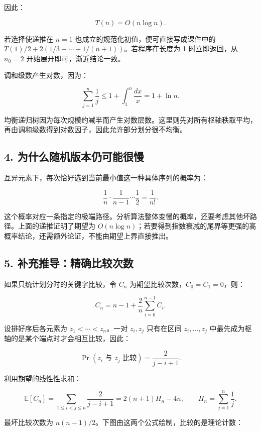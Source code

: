\documentclass[
  UTF8,fontset=none,zihao=5]{ctexart}
\let\OldSubsection\subsection
\renewcommand{\subsection}{\Needspace{4\baselineskip}\OldSubsection}
\begin{document}
因此：

\[
\boxed{T(n)=O(n\log n)}.
\]

若选择使递推在 \(n=1\) 也成立的规范化初值，便可直接写成课件中的
\(T(1)/2+2(1/3+\cdots+1/(n+1))\)。若程序在长度为 1 时立即返回，从
\(n_0=2\) 开始展开即可，渐近结论一致。

调和级数产生对数，因为：

\[
\sum_{j=1}^{n}\frac1j\le 1+\int_1^n\frac{dx}{x}=1+\ln n.
\]

均衡递归树因为每次规模约减半而产生对数层数。这里则先对所有枢轴秩取平均，再由调和级数得到对数因子，因此允许部分划分很不均衡。

\hypertarget{ux4e3aux4ec0ux4e48ux968fux673aux7248ux672cux4ecdux53efux80fdux5f88ux6162}{%
\subsection{4.
为什么随机版本仍可能很慢}\label{ux4e3aux4ec0ux4e48ux968fux673aux7248ux672cux4ecdux53efux80fdux5f88ux6162}}

互异元素下，每次恰好选到当前最小值这一种具体序列的概率为：

\[
\frac1n\cdot\frac1{n-1}\cdots\frac12=\frac1{n!}.
\]

这个概率对应一条指定的极端路径。分析算法整体变慢的概率，还要考虑其他坏路径。上面的递推证明了期望为
\(O(n\log n)\)；若要得到指数衰减的尾界等更强的高概率结论，还需额外论证，不能由期望上界直接推出。

\hypertarget{ux8865ux5145ux63a8ux5bfcux7cbeux786eux6bd4ux8f83ux6b21ux6570}{%
\subsection{5.
补充推导：精确比较次数}\label{ux8865ux5145ux63a8ux5bfcux7cbeux786eux6bd4ux8f83ux6b21ux6570}}

如果只统计划分时的关键字比较，令 \(C_n\)
为期望比较次数，\(C_0=C_1=0\)，则：

\[
C_n=n-1+\frac2n\sum_{i=0}^{n-1}C_i.
\]

设排好序后各元素为 \(z_1<\cdots<z_n\)。一对 \(z_i,z_j\) 只有在区间
\(z_i,\ldots,z_j\) 中最先成为枢轴的是某个端点时才会相互比较，因此：

\[
\Pr(z_i\text{ 与 }z_j\text{ 比较})=\frac2{j-i+1}.
\]

利用期望的线性性求和：

\[
\mathbb E[C_n]
=\sum_{1\le i<j\le n}\frac2{j-i+1}
=2(n+1)H_n-4n,
\qquad H_n=\sum_{j=1}^{n}\frac1j.
\]

最坏比较次数为 \(n(n-1)/2\)。下图由这两个公式绘制，比较的是理论计数：
\end{document}
